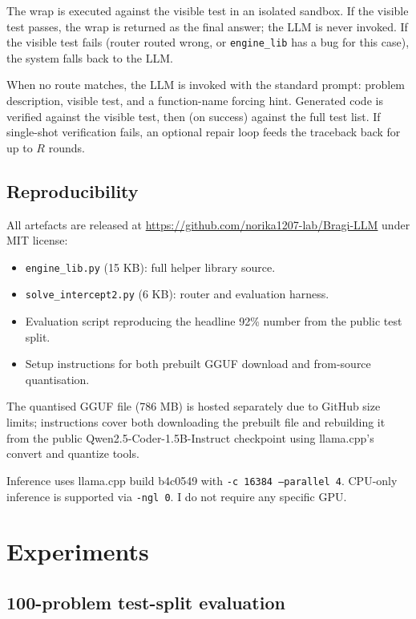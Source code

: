 \documentclass[11pt,a4paper]{article}
\begin{document}
The wrap is executed against the visible test in an isolated sandbox. If the visible test passes, the wrap is returned as the final answer; the LLM is never invoked. If the visible test fails (router routed wrong, or \texttt{engine\_lib} has a bug for this case), the system falls back to the LLM.

When no route matches, the LLM is invoked with the standard prompt: problem description, visible test, and a function-name forcing hint. Generated code is verified against the visible test, then (on success) against the full test list. If single-shot verification fails, an optional repair loop feeds the traceback back for up to $R$ rounds.

\subsection{Reproducibility}

All artefacts are released at \url{https://github.com/norika1207-lab/Bragi-LLM} under MIT license:

\begin{itemize}
\item \texttt{engine\_lib.py} (15 KB): full helper library source.
\item \texttt{solve\_intercept2.py} (6 KB): router and evaluation harness.
\item Evaluation script reproducing the headline 92\% number from the public test split.
\item Setup instructions for both prebuilt GGUF download and from-source quantisation.
\end{itemize}

The quantised GGUF file (786 MB) is hosted separately due to GitHub size limits; instructions cover both downloading the prebuilt file and rebuilding it from the public Qwen2.5-Coder-1.5B-Instruct checkpoint using llama.cpp's convert and quantize tools.

Inference uses llama.cpp build b4c0549 with \texttt{-c 16384 --parallel 4}. CPU-only inference is supported via \texttt{-ngl 0}. I do not require any specific GPU.

\section{Experiments}
\label{sec:experiments}

\subsection{100-problem test-split evaluation}
\end{document}
